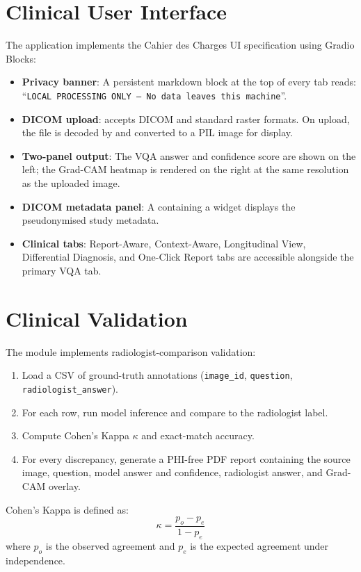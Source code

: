 \section{Clinical User Interface}
\label{sec:ui}

The  application implements
the Cahier des Charges UI specification using Gradio Blocks:

\begin{itemize}
  \item \textbf{Privacy banner}: A persistent markdown block at the top of
        every tab reads: ``\texttt{LOCAL PROCESSING ONLY -- No data leaves
        this machine}''.
  \item \textbf{DICOM upload}: 
        accepts DICOM and standard raster formats. On upload, the file is
        decoded by  and converted to a PIL image for display.
  \item \textbf{Two-panel output}: The VQA answer and confidence score are
        shown on the left; the Grad-CAM heatmap is rendered on the right
        at the same resolution as the uploaded image.
  \item \textbf{DICOM metadata panel}: A  containing a
         widget displays the pseudonymised study metadata.
  \item \textbf{Clinical tabs}: Report-Aware, Context-Aware, Longitudinal
        View, Differential Diagnosis, and One-Click Report tabs are
        accessible alongside the primary VQA tab.
\end{itemize}

\section{Clinical Validation}
\label{sec:clin_val_method}

The  module implements
radiologist-comparison validation:

\begin{enumerate}
  \item Load a CSV of ground-truth annotations
        (\texttt{image\_id}, \texttt{question}, \texttt{radiologist\_answer}).
  \item For each row, run model inference and compare to the radiologist label.
  \item Compute Cohen's Kappa $\kappa$ and exact-match accuracy.
  \item For every discrepancy, generate a PHI-free PDF report containing
        the source image, question, model answer and confidence,
        radiologist answer, and Grad-CAM overlay.
\end{enumerate}

Cohen's Kappa is defined as:
\begin{equation}
  \kappa = \frac{p_o - p_e}{1 - p_e}
  \label{eq:kappa}
\end{equation}
where $p_o$ is the observed agreement and $p_e$ is the expected agreement
under independence.
